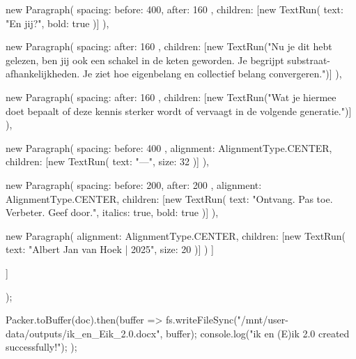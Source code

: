 {{      new Paragraph({
        spacing: { before: 400, after: 160 },
        children: [new TextRun({ text: "En jij?", bold: true })]
      }),

      new Paragraph({
        spacing: { after: 160 },
        children: [new TextRun("Nu je dit hebt gelezen, ben jij ook een schakel in de keten geworden. Je begrijpt substraat-afhankelijkheden. Je ziet hoe eigenbelang en collectief belang convergeren.")]
      }),

      new Paragraph({
        spacing: { after: 160 },
        children: [new TextRun("Wat je hiermee doet bepaalt of deze kennis sterker wordt of vervaagt in de volgende generatie.")]
      }),

      new Paragraph({
        spacing: { before: 400 },
        alignment: AlignmentType.CENTER,
        children: [new TextRun({ text: "—", size: 32 })]
      }),

      new Paragraph({
        spacing: { before: 200, after: 200 },
        alignment: AlignmentType.CENTER,
        children: [new TextRun({ text: "Ontvang. Pas toe. Verbeter. Geef door.", italics: true, bold: true })]
      }),

      new Paragraph({
        alignment: AlignmentType.CENTER,
        children: [new TextRun({ text: "Albert Jan van Hoek | 2025", size: 20 })]
      })
    ]
  }]
});

Packer.toBuffer(doc).then(buffer => {
  fs.writeFileSync("/mnt/user-data/outputs/ik_en_Eik_2.0.docx", buffer);
  console.log("ik en (E)ik 2.0 created successfully!");
});